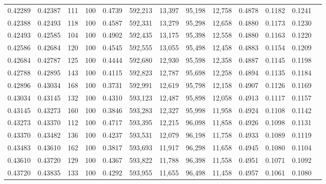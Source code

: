 \begin{tabular}{rrrrrrrrrrrrr}
0.42289 & 0.42387 &   111 & 100 &                                     0.4739 & 592,213 &  13,397 &  95,198 &  12,758 & 0.4878 & 0.1182 & 0.1241 \\
0.42388 & 0.42493 &   118 & 100 &                                     0.4587 & 592,331 &  13,279 &  95,298 &  12,658 & 0.4880 & 0.1173 & 0.1230 \\
0.42493 & 0.42585 &   104 & 100 &                                     0.4902 & 592,435 &  13,175 &  95,398 &  12,558 & 0.4880 & 0.1163 & 0.1220 \\
0.42586 & 0.42684 &   120 & 100 &                                     0.4545 & 592,555 &  13,055 &  95,498 &  12,458 & 0.4883 & 0.1154 & 0.1209 \\
0.42684 & 0.42787 &   125 & 100 &                                     0.4444 & 592,680 &  12,930 &  95,598 &  12,358 & 0.4887 & 0.1145 & 0.1198 \\
0.42788 & 0.42895 &   143 & 100 &                                     0.4115 & 592,823 &  12,787 &  95,698 &  12,258 & 0.4894 & 0.1135 & 0.1184 \\
0.42896 & 0.43034 &   168 & 100 &                                     0.3731 & 592,991 &  12,619 &  95,798 &  12,158 & 0.4907 & 0.1126 & 0.1169 \\
0.43034 & 0.43145 &   132 & 100 &                                     0.4310 & 593,123 &  12,487 &  95,898 &  12,058 & 0.4913 & 0.1117 & 0.1157 \\
0.43145 & 0.43273 &   160 & 100 &                                     0.3846 & 593,283 &  12,327 &  95,998 &  11,958 & 0.4924 & 0.1108 & 0.1142 \\
0.43273 & 0.43370 &   112 & 100 &                                     0.4717 & 593,395 &  12,215 &  96,098 &  11,858 & 0.4926 & 0.1098 & 0.1131 \\
0.43370 & 0.43482 &   136 & 100 &                                     0.4237 & 593,531 &  12,079 &  96,198 &  11,758 & 0.4933 & 0.1089 & 0.1119 \\
0.43483 & 0.43610 &   162 & 100 &                                     0.3817 & 593,693 &  11,917 &  96,298 &  11,658 & 0.4945 & 0.1080 & 0.1104 \\
0.43610 & 0.43720 &   129 & 100 &                                     0.4367 & 593,822 &  11,788 &  96,398 &  11,558 & 0.4951 & 0.1071 & 0.1092 \\
0.43720 & 0.43835 &   133 & 100 &                                     0.4292 & 593,955 &  11,655 &  96,498 &  11,458 & 0.4957 & 0.1061 & 0.1080 \\

\end{tabular}
